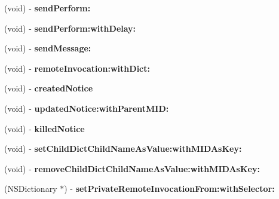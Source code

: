 \begin{DoxyCompactItemize}
\item 
\hypertarget{interface_messenger_system_a60cbd00cd24aa502aa77d86e4391a1b7}{
(void) -\/ {\bfseries sendPerform:}}
\label{dc/dc9/interface_messenger_system_a60cbd00cd24aa502aa77d86e4391a1b7}

\item 
\hypertarget{interface_messenger_system_a12e9a8d84b6cb12f55bf7453166cfab1}{
(void) -\/ {\bfseries sendPerform:withDelay:}}
\label{dc/dc9/interface_messenger_system_a12e9a8d84b6cb12f55bf7453166cfab1}

\item 
\hypertarget{interface_messenger_system_a0938a6c892b3a634870238b4555dc921}{
(void) -\/ {\bfseries sendMessage:}}
\label{dc/dc9/interface_messenger_system_a0938a6c892b3a634870238b4555dc921}

\item 
\hypertarget{interface_messenger_system_a51502df160822ba7c6fd754fdc6353de}{
(void) -\/ {\bfseries remoteInvocation:withDict:}}
\label{dc/dc9/interface_messenger_system_a51502df160822ba7c6fd754fdc6353de}

\item 
\hypertarget{interface_messenger_system_a7e77f9abb100c6123caaa291d7f92ffb}{
(void) -\/ {\bfseries createdNotice}}
\label{dc/dc9/interface_messenger_system_a7e77f9abb100c6123caaa291d7f92ffb}

\item 
\hypertarget{interface_messenger_system_a28703ac96f244da4d7c62207cf65ff69}{
(void) -\/ {\bfseries updatedNotice:withParentMID:}}
\label{dc/dc9/interface_messenger_system_a28703ac96f244da4d7c62207cf65ff69}

\item 
\hypertarget{interface_messenger_system_a127cce35cc1c079fed1bceecccf23a66}{
(void) -\/ {\bfseries killedNotice}}
\label{dc/dc9/interface_messenger_system_a127cce35cc1c079fed1bceecccf23a66}

\item 
\hypertarget{interface_messenger_system_a57dd4208efc5d477c50c5c5f55fe7ff1}{
(void) -\/ {\bfseries setChildDictChildNameAsValue:withMIDAsKey:}}
\label{dc/dc9/interface_messenger_system_a57dd4208efc5d477c50c5c5f55fe7ff1}

\item 
\hypertarget{interface_messenger_system_aadeb829f6e394bbc36d77593ed6fe677}{
(void) -\/ {\bfseries removeChildDictChildNameAsValue:withMIDAsKey:}}
\label{dc/dc9/interface_messenger_system_aadeb829f6e394bbc36d77593ed6fe677}

\item 
\hypertarget{interface_messenger_system_a4ea61787df15874f8db773d159b6d10c}{
(NSDictionary $\ast$) -\/ {\bfseries setPrivateRemoteInvocationFrom:withSelector:}}
\label{dc/dc9/interface_messenger_system_a4ea61787df15874f8db773d159b6d10c}


\end{DoxyCompactItemize}
